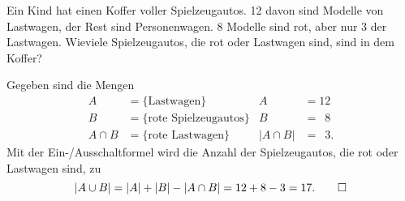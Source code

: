 Ein Kind hat einen Koffer voller Spielzeugautos.
12 davon sind Modelle von Lastwagen, der Rest sind Personenwagen.
8 Modelle sind rot, aber nur 3 der Lastwagen.
Wieviele Spielzeugautos, die rot oder Lastwagen sind, sind in dem Koffer?

\begin{loesung}
Gegeben sind die Mengen
\begin{align*}
      A &= \{\text{Lastwagen}\}           &        A  &= 12          \\
      B &= \{\text{rote Spielzeugautos}\} &        B  &= \phantom{0}8\\
A\cap B &= \{\text{rote Lastwagen\}}      & |A\cap B| &= \phantom{0}3.
\end{align*}
Mit der Ein-/Ausschaltformel wird die Anzahl der Spielzeugautos, die rot
oder Lastwagen sind, zu 
\[
|A\cup B|
=
|A| + |B| - |A\cap B|
=
12 + 8 - 3
=
17.
\qedhere
\]
\end{loesung}

